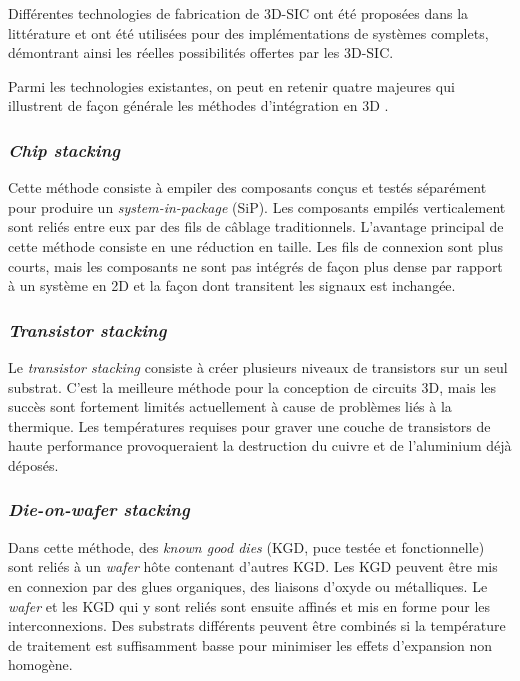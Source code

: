Différentes technologies de fabrication de 3D-SIC ont été proposées dans la littérature et ont été utilisées pour des implémentations de systèmes complets, démontrant ainsi les réelles possibilités offertes par les 3D-SIC.

Parmi les technologies existantes, on peut en retenir quatre majeures qui illustrent de façon générale les méthodes d'intégration en 3D \cite{659500}.

\subsubsection*{\textit{Chip stacking}}

Cette méthode consiste à empiler des composants conçus et testés séparément pour produire un \textit{system-in-package} (SiP). Les composants empilés verticalement sont reliés entre eux par des fils de câblage traditionnels. L'avantage principal de cette méthode consiste en une réduction en taille. Les fils de connexion sont plus courts, mais les composants ne sont pas intégrés de façon plus dense par rapport à un système en 2D et la façon dont transitent les signaux est inchangée.

\subsubsection*{\textit{Transistor stacking}}

Le \textit{transistor stacking} consiste à créer plusieurs niveaux de transistors sur un seul substrat. C'est la meilleure méthode pour la conception de circuits 3D, mais les succès sont fortement limités actuellement à cause de problèmes liés à la thermique. Les températures requises pour graver une couche de transistors de haute performance provoqueraient la destruction du cuivre et de l'aluminium déjà déposés.

\subsubsection*{\textit{Die-on-wafer stacking}}

Dans cette méthode, des \textit{known good dies} (KGD, puce testée et fonctionnelle) sont reliés à un \textit{wafer} hôte contenant d'autres KGD. Les KGD peuvent être mis en connexion par des glues organiques, des liaisons d'oxyde ou métalliques. Le \textit{wafer} et les KGD qui y sont reliés sont ensuite affinés et mis en forme pour les interconnexions. Des substrats différents peuvent être combinés si la température de traitement est suffisamment basse pour minimiser les effets d'expansion non homogène.

